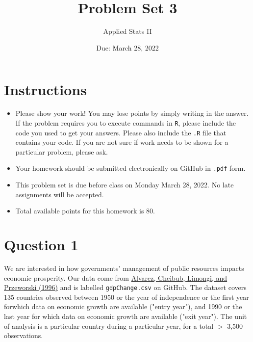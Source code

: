 \documentclass[12pt,letterpaper]{article}
\title{Problem Set 3}
\date{Due: March 28, 2022}
\author{Applied Stats II}
\begin{document}
	\maketitle
	\section*{Instructions}
	\begin{itemize}
		\item Please show your work! You may lose points by simply writing in the answer. If the problem requires you to execute commands in \texttt{R}, please include the code you used to get your answers. Please also include the \texttt{.R} file that contains your code. If you are not sure if work needs to be shown for a particular problem, please ask.
		\item Your homework should be submitted electronically on GitHub in \texttt{.pdf} form.
		\item This problem set is due before class on Monday March 28, 2022. No late assignments will be accepted.
		\item Total available points for this homework is 80.
	\end{itemize}

	\vspace{.25cm}
\section*{Question 1}
\vspace{.25cm}
\noindent We are interested in how governments' management of public resources impacts economic prosperity. Our data come from \href{https://www.researchgate.net/profile/Adam_Przeworski/publication/240357392_Classifying_Political_Regimes/links/0deec532194849aefa000000/Classifying-Political-Regimes.pdf}{Alvarez, Cheibub, Limongi, and Przeworski (1996)} and is labelled \texttt{gdpChange.csv} on GitHub. The dataset covers 135 countries observed between 1950 or the year of independence or the first year forwhich data on economic growth are available ("entry year"), and 1990 or the last year for which data on economic growth are available ("exit year"). The unit of analysis is a particular country during a particular year, for a total $>$ 3,500 observations. 
\end{document}
